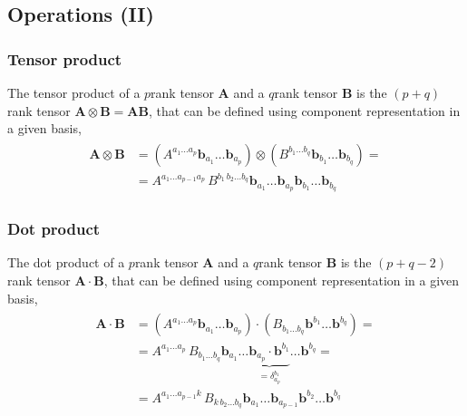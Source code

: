 \documentclass[letterpaper,10pt,english]{jupyterBook}
\begin{document}
\subsection{Operations (II)}
\label{\detokenize{ch/tensor-algebra-calculus/algebra:operations-ii}}

\subsubsection{Tensor product}
\label{\detokenize{ch/tensor-algebra-calculus/algebra:tensor-product}}
\sphinxAtStartPar
The tensor product of a \(p\)\sphinxhyphen{}rank tensor \(\mathbf{A}\) and a \(q\)\sphinxhyphen{}rank tensor \(\mathbf{B}\) is the \((p+q)\)\sphinxhyphen{}rank tensor \(\mathbf{A} \otimes \mathbf{B} = \mathbf{A} \mathbf{B}\), that can be defined using component representation in a given basis,
\begin{equation*}
\begin{split}\begin{aligned}
  \mathbf{A} \otimes \mathbf{B} 
  & = \left( A^{a_1 \dots a_p} \mathbf{b}_{a_1} \dots \mathbf{b}_{a_p} \right) \otimes \left( B^{b_1 \dots b_q} \mathbf{b}_{b_1} \dots \mathbf{b}_{b_q} \right) = \\
  & = A^{a_1 \dots a_{p-1} a_p} \, B^{b_1 \, b_2 \dots b_q} \mathbf{b}_{a_1} \dots \mathbf{b}_{a_p} \mathbf{b}_{b_1} \dots\mathbf{b}_{b_q}
\end{aligned}\end{split}
\end{equation*}

\subsubsection{Dot product}
\label{\detokenize{ch/tensor-algebra-calculus/algebra:dot-product}}
\sphinxAtStartPar
The dot product of a \(p\)\sphinxhyphen{}rank tensor \(\mathbf{A}\) and a \(q\)\sphinxhyphen{}rank tensor \(\mathbf{B}\) is the \((p+q-2)\)\sphinxhyphen{}rank tensor \(\mathbf{A} \cdot \mathbf{B}\), that can be defined using component representation in a given basis,
\begin{equation*}
\begin{split}\begin{aligned}
  \mathbf{A} \cdot \mathbf{B} 
  & = \left( A^{a_1 \dots a_p} \mathbf{b}_{a_1} \dots \mathbf{b}_{a_p} \right) \cdot \left( B_{b_1 \dots b_q} \mathbf{b}^{b_1} \dots \mathbf{b}^{b_q} \right) = \\
  & = A^{a_1 \dots a_p} \, B_{b_1 \dots b_q} \mathbf{b}_{a_1} \dots \underbrace{ \mathbf{b}_{a_p} \cdot \mathbf{b}^{b_1} }_{= \delta_{a_p}^{b_1} } \dots \mathbf{b}^{b_q} = \\
  & = A^{a_1 \dots a_{p-1} k} \, B_{k \, b_2 \dots b_q} \mathbf{b}_{a_1} \dots \mathbf{b}_{a_{p-1}} \mathbf{b}^{b_2} \dots \mathbf{b}^{b_q}
\end{aligned}\end{split}
\end{equation*}
\end{document}
